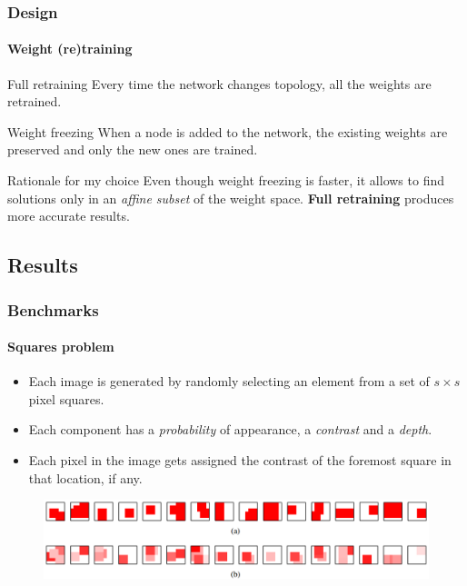 \documentclass{beamer}
\begin{document}
			\begin{frame}
				\frametitle{Design}
				\framesubtitle{Weight (re)training}
				\begin{block}{Full retraining}
					Every time the network changes topology, all the weights are retrained.
				\end{block}
				\begin{block}{Weight freezing}
					When a node is added to the network, the existing weights are preserved and only the new ones are trained.
				\end{block}
				\begin{exampleblock}{Rationale for my choice}
					Even though weight freezing is faster, it allows to find solutions only in an \emph{affine subset} of the weight space. \textbf{Full retraining} produces more accurate results.
				\end{exampleblock}
			\end{frame}


		\subsection{Results}
			\begin{frame}
				\frametitle{Benchmarks}
				\framesubtitle{Squares problem}
				\begin{itemize}
					\item Each image is generated by randomly selecting an element from a set of $s \times s$ pixel squares.
					\item Each component has a \emph{probability} of appearance, a \emph{contrast} and a \emph{depth}.
					\item Each pixel in the image gets assigned the contrast of the foremost square in that location, if any.
				\end{itemize}
				\begin{figure}[h]
					\centering
					\includegraphics[width=\textwidth]{squares}
				\end{figure}
			\end{frame}
\end{document}
